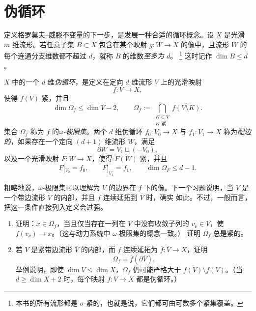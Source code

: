 
\section{伪循环}\label{sec:6-5}

定义格罗莫夫--威滕不变量的下一步，是发展一种合适的循环概念。设 $X$ 是光滑
$m$ 维流形。若任意子集 $B\subset X$ 包含在某个映射 $g:W\to X$ 的像中，且流形
$W$ 的每个连通分支维数都不超过 $d$，就称 $B$ 的维数\emph{至多为 $d$}。
\footnote{本书的所有流形都是 $\sigma$-紧的，也就是说，它们都可由可数多个紧集覆盖。}
这时记作 $\dim B\le d$。

\begin{definition}\label{def:6-5-1}
$X$ 中的一个 $d$ 维\emph{伪循环}，是定义在定向 $d$ 维流形 $V$ 上的光滑映射
\[
  f:V\longrightarrow X,
\]
使得 $\overline{f(V)}$ 紧，并且
\[
  \dim\Omega_f\le\dim V-2,
  \qquad
  \Omega_f:=
  \bigcap_{\substack{K\subset V\\K\text{ 紧}}}
  \overline{f(V\setminus K)}.
\]
集合 $\Omega_f$ 称为 $f$ 的\emph{$\omega$-极限集}。两个 $d$ 维伪循环
$f_0:V_0\to X$ 与 $f_1:V_1\to X$ 称为\emph{配边的}，如果存在一个定向
$(d+1)$ 维流形 $W$，满足
\[
  \partial W=V_1\sqcup(-V_0),
\]
以及一个光滑映射 $F:W\to X$，使得 $\overline{F(W)}$ 紧，并且
\[
  F|_{V_0}=f_0,\qquad
  F|_{V_1}=f_1,\qquad
  \dim\Omega_F\le d-1.
\]
\end{definition}

粗略地说，$\omega$-极限集可以理解为 $V$ 的边界在 $f$ 下的像。下一个习题说明，当
$V$ 是一个带边流形 $\overline V$ 的内部，并且 $f$ 连续延拓到 $\overline V$ 时，确实
如此。不过，一般而言，把这一条件直接列入定义会过强。

\begin{exercise}\label{ex:6-5-2}
\begin{enumerate}[label=(\roman*),leftmargin=3em]
\item 证明：$x\in\Omega_f$，当且仅当存在一列在 $V$ 中没有收敛子列的
$v_\nu\in V$，使 $f(v_\nu)\to x$。（这与动力系统中 $\omega$-极限集的概念一致。）
证明 $\Omega_f$ 总是紧的。
\item 若 $V$ 是紧带边流形 $\overline V$ 的内部，而 $f$ 连续延拓为
$\overline f:\overline V\to X$，证明
\[
  \Omega_f=\overline f(\partial\overline V).
\]
举例说明，即使 $\dim V\le\dim X$，$\Omega_f$ 仍可能严格大于
$\overline{f(V)}\setminus f(V)$。（当 $d\ge\dim X+2$ 时，每个映射
$f:V\to X$ 都是伪循环。）
\end{enumerate}
\end{exercise}

